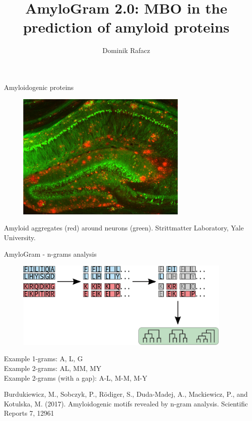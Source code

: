 \documentclass{beamer}
\title{AmyloGram 2.0: MBO in the prediction of amyloid proteins}
\date{}
\author{Dominik Rafacz}
\institute{Politechnika Warszawska, Faculty of Mathematics and Computer Science}
\begin{document}



\maketitle
\begin{frame}{Amyloidogenic proteins}
  \begin{figure} 
    \includegraphics[width=0.75\textwidth]{figures/amyloid_aggregates.jpg}
  \end{figure}
  
  \footnotesize
  Amyloid aggregates (red) around neurons (green). Strittmatter Laboratory, Yale University.
\end{frame}


\begin{frame}{AmyloGram - n-grams analysis}
  \begin{figure} 
    \includegraphics[width=0.95\textwidth]{figures/ngram1.eps}
  \end{figure}
  
  Example 1-grams: A, L, G \\
  Example 2-grams: AL, MM, MY \\
  Example 2-grams (with a gap): A-L, M-M, M-Y
  
  \begin{tiny}
    Burdukiewicz, M., Sobczyk, P., Rödiger, S., Duda-Madej, A., Mackiewicz, P., and Kotulska, M. (2017). Amyloidogenic motifs revealed by n-gram analysis. Scientific Reports 7, 12961 \\
  \end{tiny}
\end{frame} 
\end{document}
